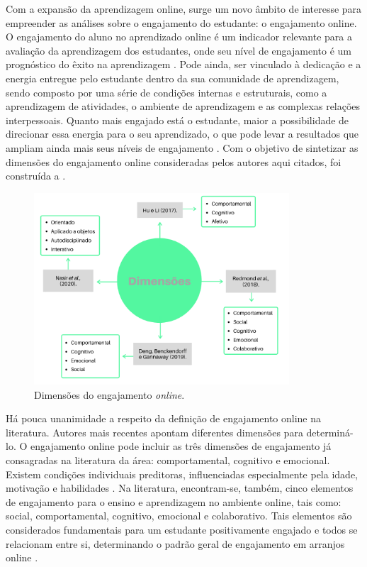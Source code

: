 \documentclass[portuguese]{textolivre}
\begin{document}
Com a expansão da aprendizagem online, surge um novo âmbito de interesse para empreender as análises sobre o engajamento do estudante: o engajamento online. O engajamento do aluno no aprendizado online é um indicador relevante para a avaliação da aprendizagem dos estudantes, onde seu nível de engajamento é um prognóstico do êxito na aprendizagem \cite{hu2017}. Pode ainda, ser vinculado à dedicação e a energia entregue pelo estudante dentro da sua comunidade de aprendizagem, sendo composto por uma série de condições internas e estruturais, como a aprendizagem de atividades, o ambiente de aprendizagem e as complexas relações interpessoais. Quanto mais engajado está o estudante, maior a possibilidade de direcionar essa energia para o seu aprendizado, o que pode levar a resultados que ampliam ainda mais seus níveis de engajamento \cite{bond2019}. Com o objetivo de sintetizar as dimensões do engajamento online consideradas pelos autores aqui citados, foi construída a .

\begin{figure}[htbp]
 \centering
 \includegraphics[width=0.85\textwidth]{fig1-35747.png}
 \caption{Dimensões do engajamento \textit{online}.}
 \label{fig1}
\end{figure}

Há pouca unanimidade a respeito da definição de engajamento online na literatura. Autores mais recentes apontam diferentes dimensões para determiná-lo. O engajamento online pode incluir as três dimensões de engajamento já consagradas na literatura da área: comportamental, cognitivo e emocional. Existem condições individuais preditoras, influenciadas especialmente pela idade, motivação e habilidades \cite{hu2017}. Na literatura, encontram-se, também, cinco elementos de engajamento para o ensino e aprendizagem no ambiente online, tais como: social, comportamental, cognitivo, emocional e colaborativo. Tais elementos são considerados fundamentais para um estudante positivamente engajado e todos se relacionam entre si, determinando o padrão geral de engajamento em arranjos online \cite{redmond2018}.
\end{document}
